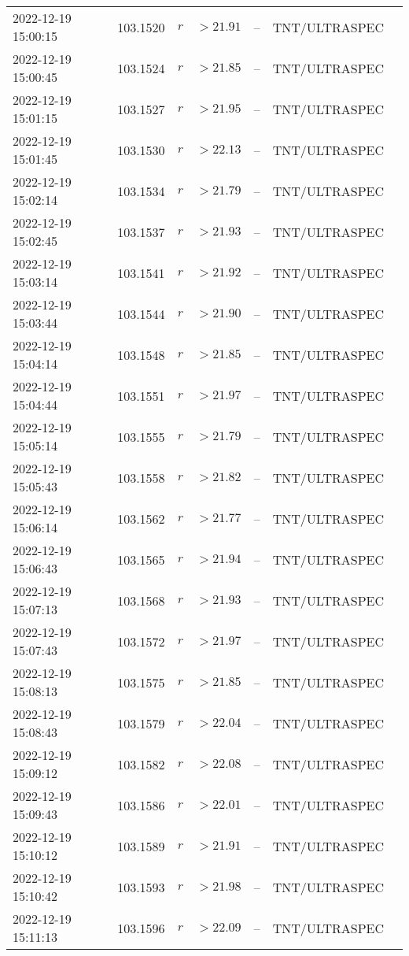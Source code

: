 \documentclass{nature_plusfigure}
\begin{document}
\begin{supplement}
\begin{center}
\begin{longtable}{lllllll}
2022-12-19 15:00:15 & 103.1520 & $r$ & $>21.91$ & -- & TNT/ULTRASPEC &  \\ 
2022-12-19 15:00:45 & 103.1524 & $r$ & $>21.85$ & -- & TNT/ULTRASPEC &  \\ 
2022-12-19 15:01:15 & 103.1527 & $r$ & $>21.95$ & -- & TNT/ULTRASPEC &  \\ 
2022-12-19 15:01:45 & 103.1530 & $r$ & $>22.13$ & -- & TNT/ULTRASPEC &  \\ 
2022-12-19 15:02:14 & 103.1534 & $r$ & $>21.79$ & -- & TNT/ULTRASPEC &  \\ 
2022-12-19 15:02:45 & 103.1537 & $r$ & $>21.93$ & -- & TNT/ULTRASPEC &  \\ 
2022-12-19 15:03:14 & 103.1541 & $r$ & $>21.92$ & -- & TNT/ULTRASPEC &  \\ 
2022-12-19 15:03:44 & 103.1544 & $r$ & $>21.90$ & -- & TNT/ULTRASPEC &  \\ 
2022-12-19 15:04:14 & 103.1548 & $r$ & $>21.85$ & -- & TNT/ULTRASPEC &  \\ 
2022-12-19 15:04:44 & 103.1551 & $r$ & $>21.97$ & -- & TNT/ULTRASPEC &  \\ 
2022-12-19 15:05:14 & 103.1555 & $r$ & $>21.79$ & -- & TNT/ULTRASPEC &  \\ 
2022-12-19 15:05:43 & 103.1558 & $r$ & $>21.82$ & -- & TNT/ULTRASPEC &  \\ 
2022-12-19 15:06:14 & 103.1562 & $r$ & $>21.77$ & -- & TNT/ULTRASPEC &  \\ 
2022-12-19 15:06:43 & 103.1565 & $r$ & $>21.94$ & -- & TNT/ULTRASPEC &  \\ 
2022-12-19 15:07:13 & 103.1568 & $r$ & $>21.93$ & -- & TNT/ULTRASPEC &  \\ 
2022-12-19 15:07:43 & 103.1572 & $r$ & $>21.97$ & -- & TNT/ULTRASPEC &  \\ 
2022-12-19 15:08:13 & 103.1575 & $r$ & $>21.85$ & -- & TNT/ULTRASPEC &  \\ 
2022-12-19 15:08:43 & 103.1579 & $r$ & $>22.04$ & -- & TNT/ULTRASPEC &  \\ 
2022-12-19 15:09:12 & 103.1582 & $r$ & $>22.08$ & -- & TNT/ULTRASPEC &  \\ 
2022-12-19 15:09:43 & 103.1586 & $r$ & $>22.01$ & -- & TNT/ULTRASPEC &  \\ 
2022-12-19 15:10:12 & 103.1589 & $r$ & $>21.91$ & -- & TNT/ULTRASPEC &  \\ 
2022-12-19 15:10:42 & 103.1593 & $r$ & $>21.98$ & -- & TNT/ULTRASPEC &  \\ 
2022-12-19 15:11:13 & 103.1596 & $r$ & $>22.09$ & -- & TNT/ULTRASPEC &  \\ 

\end{longtable}
\end{center}
\end{supplement}
\end{document}
